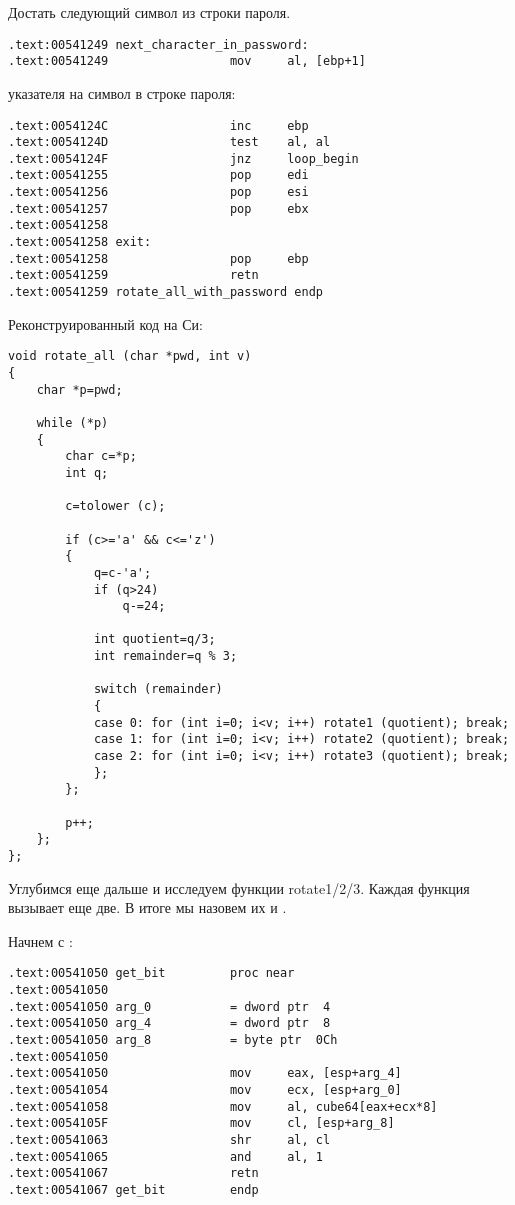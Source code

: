 Достать следующий символ из строки пароля.

\begin{lstlisting}[style=customasm]
.text:00541249 next_character_in_password:
.text:00541249                 mov     al, [ebp+1]
\end{lstlisting}

 указателя на символ в строке пароля:

\begin{lstlisting}[style=customasm]
.text:0054124C                 inc     ebp
.text:0054124D                 test    al, al
.text:0054124F                 jnz     loop_begin
.text:00541255                 pop     edi
.text:00541256                 pop     esi
.text:00541257                 pop     ebx
.text:00541258
.text:00541258 exit:
.text:00541258                 pop     ebp
.text:00541259                 retn
.text:00541259 rotate_all_with_password endp
\end{lstlisting}

Реконструированный код на Си:

\begin{lstlisting}[style=customc]
void rotate_all (char *pwd, int v)
{
	char *p=pwd;

	while (*p)
	{
		char c=*p;
		int q;

		c=tolower (c);

		if (c>='a' && c<='z')
		{
			q=c-'a';
			if (q>24)
				q-=24;

			int quotient=q/3;
			int remainder=q % 3;

			switch (remainder)
			{
			case 0: for (int i=0; i<v; i++) rotate1 (quotient); break;
			case 1: for (int i=0; i<v; i++) rotate2 (quotient); break;
			case 2: for (int i=0; i<v; i++) rotate3 (quotient); break;
			};
		};

		p++;
	};
};
\end{lstlisting}

Углубимся еще дальше и исследуем функции rotate1/2/3.
Каждая функция вызывает еще две.
В итоге мы назовем их  и .

Начнем с :

\begin{lstlisting}[style=customasm]
.text:00541050 get_bit         proc near
.text:00541050
.text:00541050 arg_0           = dword ptr  4
.text:00541050 arg_4           = dword ptr  8
.text:00541050 arg_8           = byte ptr  0Ch
.text:00541050
.text:00541050                 mov     eax, [esp+arg_4]
.text:00541054                 mov     ecx, [esp+arg_0]
.text:00541058                 mov     al, cube64[eax+ecx*8]
.text:0054105F                 mov     cl, [esp+arg_8]
.text:00541063                 shr     al, cl
.text:00541065                 and     al, 1
.text:00541067                 retn
.text:00541067 get_bit         endp
\end{lstlisting}

